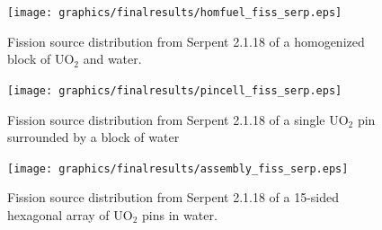 \begin{figure}[h!] 
  \centering
    \texttt{[image: graphics/finalresults/homfuel\_fiss\_serp.eps]}
     \caption{Fission source distribution from Serpent 2.1.18 of a homogenized block of UO$_2$ and water. \label{serp_homfuel_mesh} }
\end{figure}

\begin{figure}[h!] 
  \centering
    \texttt{[image: graphics/finalresults/pincell\_fiss\_serp.eps]}
     \caption{Fission source distribution from Serpent 2.1.18 of a single UO$_2$ pin surrounded by a block of water  \label{serp_pincell_mesh} }
\end{figure}

\begin{figure}[h!] 
  \centering
    \texttt{[image: graphics/finalresults/assembly\_fiss\_serp.eps]}
     \caption{Fission source distribution from Serpent 2.1.18 of a 15-sided hexagonal array of UO$_2$ pins in water. \label{serp_assembly_mesh} }
\end{figure}
